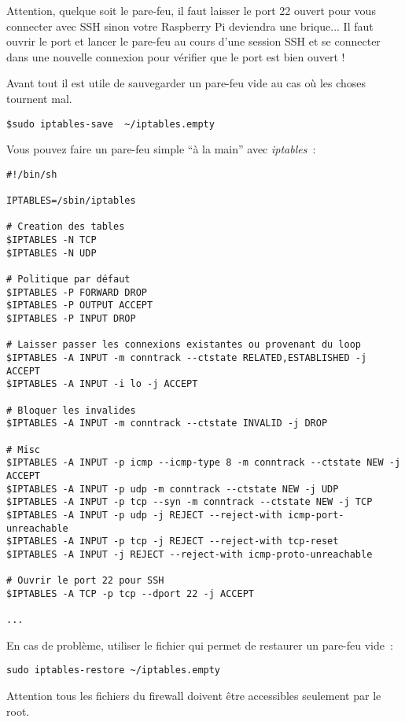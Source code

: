 Attention, quelque soit le pare-feu, il faut laisser le port 22 ouvert pour vous connecter avec SSH sinon votre Raspberry Pi deviendra une brique... Il faut ouvrir le port et lancer le pare-feu au cours d'une session SSH et se connecter dans une nouvelle connexion pour vérifier que le port est bien ouvert !

Avant tout il est utile de sauvegarder un pare-feu vide au cas où les choses tournent mal.

\begin{verbatim}
$sudo iptables-save  ~/iptables.empty
\end{verbatim}

Vous pouvez faire un pare-feu simple ``à la main'' avec \emph{iptables}~:
\begin{verbatim}
#!/bin/sh

IPTABLES=/sbin/iptables

# Creation des tables
$IPTABLES -N TCP
$IPTABLES -N UDP

# Politique par défaut
$IPTABLES -P FORWARD DROP
$IPTABLES -P OUTPUT ACCEPT
$IPTABLES -P INPUT DROP

# Laisser passer les connexions existantes ou provenant du loop
$IPTABLES -A INPUT -m conntrack --ctstate RELATED,ESTABLISHED -j ACCEPT
$IPTABLES -A INPUT -i lo -j ACCEPT

# Bloquer les invalides
$IPTABLES -A INPUT -m conntrack --ctstate INVALID -j DROP

# Misc
$IPTABLES -A INPUT -p icmp --icmp-type 8 -m conntrack --ctstate NEW -j ACCEPT
$IPTABLES -A INPUT -p udp -m conntrack --ctstate NEW -j UDP
$IPTABLES -A INPUT -p tcp --syn -m conntrack --ctstate NEW -j TCP
$IPTABLES -A INPUT -p udp -j REJECT --reject-with icmp-port-unreachable
$IPTABLES -A INPUT -p tcp -j REJECT --reject-with tcp-reset
$IPTABLES -A INPUT -j REJECT --reject-with icmp-proto-unreachable

# Ouvrir le port 22 pour SSH
$IPTABLES -A TCP -p tcp --dport 22 -j ACCEPT

...
\end{verbatim}

En cas de problème, utiliser le fichier qui permet de restaurer un pare-feu vide~:

\begin{verbatim}
sudo iptables-restore ~/iptables.empty
\end{verbatim}

Attention tous les fichiers du firewall doivent être accessibles seulement par le root.

